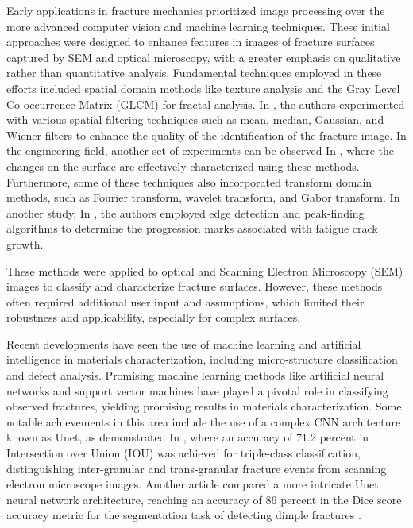 \documentclass{ieeeaccess}
\begin{document}
Early applications in fracture mechanics prioritized image processing over the more advanced computer vision and machine learning techniques.
These initial approaches were designed to enhance features in images of fracture surfaces captured by SEM and optical microscopy, with a greater emphasis on qualitative rather than quantitative analysis.
Fundamental techniques employed in these efforts included spatial domain methods like texture analysis and the Gray Level Co-occurrence Matrix (GLCM) for fractal analysis.
In \cite{zain2009enhancement}, the authors experimented with various spatial filtering techniques such as mean, median, Gaussian, and Wiener filters to enhance the quality of the identification of the fracture image.
In the engineering field, another set of experiments can be observed In \cite{das2011characterization}, where the changes on the surface are effectively characterized using these methods.
Furthermore, some of these techniques also incorporated transform domain methods, such as Fourier transform, wavelet transform, and Gabor transform.
In another study, In \cite{hu2017automation}, the authors employed edge detection and peak-finding algorithms to determine the progression marks associated with fatigue crack growth.

These methods were applied to optical and Scanning Electron Microscopy (SEM) images to classify and characterize fracture surfaces.
However, these methods often required additional user input and assumptions, which limited their robustness and applicability, especially for complex surfaces.

Recent developments have seen the use of machine learning and artificial intelligence in materials characterization, including micro-structure classification and defect analysis.
Promising machine learning methods like artificial neural networks and support vector machines have played a pivotal role in classifying observed fractures, yielding promising results in materials characterization.
Some notable achievements in this area include the use of a complex CNN architecture known as Unet,
as demonstrated In \cite{tsopanidis2020toward}, where an accuracy of 71.2 percent in Intersection over Union (IOU) was achieved for triple-class classification,
distinguishing inter-granular and trans-granular fracture events from scanning electron microscope images.
Another article compared a more intricate Unet neural network architecture, reaching an accuracy of 86 percent in the Dice score accuracy metric for the segmentation task of detecting dimple fractures \cite{sinha2021deep}.
\end{document}
